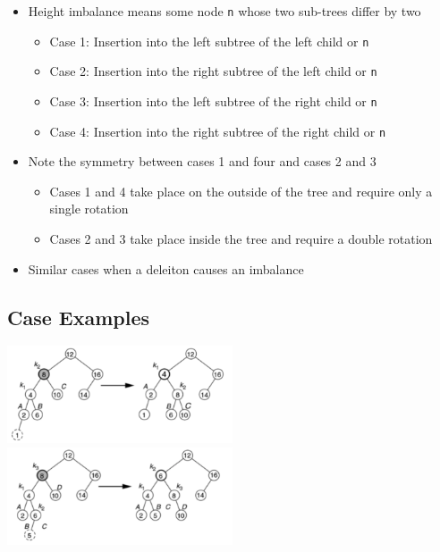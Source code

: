 \documentclass[
  10pt,
  english,
  letterpaper,
,tablecaptionabove
]{scrartcl}
\newcommand{\passthrough}[1]{#1}
\providecommand{\tightlist}{%
  \setlength{\itemsep}{0pt}\setlength{\parskip}{0pt}}
\begin{document}
\begin{itemize}
\tightlist
\item
  Height imbalance means some node \passthrough{\lstinline!n!} whose two
  sub-trees differ by two

  \begin{itemize}
  \tightlist
  \item
    Case 1: Insertion into the left subtree of the left child or
    \passthrough{\lstinline!n!}
  \item
    Case 2: Insertion into the right subtree of the left child or
    \passthrough{\lstinline!n!}
  \item
    Case 3: Insertion into the left subtree of the right child or
    \passthrough{\lstinline!n!}
  \item
    Case 4: Insertion into the right subtree of the right child or
    \passthrough{\lstinline!n!}
  \end{itemize}
\item
  Note the symmetry between cases 1 and four and cases 2 and 3

  \begin{itemize}
  \tightlist
  \item
    Cases 1 and 4 take place on the outside of the tree and require only
    a single rotation
  \item
    Cases 2 and 3 take place inside the tree and require a double
    rotation
  \end{itemize}
\item
  Similar cases when a deleiton causes an imbalance
\end{itemize}

\hypertarget{case-examples}{%
\subsection{Case Examples}\label{case-examples}}

\includegraphics[width=0.5\textwidth,height=\textheight]{images/1.png}
\includegraphics[width=0.5\textwidth,height=\textheight]{images/2.png}
\end{document}
